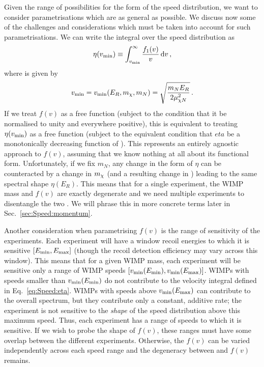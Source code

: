 Given the range of possibilities for the form of the speed distribution, we want to consider parametrisations which are as general as possible. We discuss now some of the challenges and considerations which must be taken into account for such parametrisations. We can write the integral over the speed distribution as
\begin{equation}
\label{eq:Speed:eta}
\eta(\vmin) \equiv \int_{\vmin}^\infty \frac{f_1(v)}{v}\,\mathrm{d}v\,,
\end{equation}
where \vmin is given by
\begin{equation}
v_\textrm{min} = v_\textrm{min}(E_R, \mchi, m_N) = \sqrt{\frac{m_N E_R}{2 \mu_{\chi N}^2}}\,.
\end{equation}
If we treat $f(v)$ as a free function (subject to the condition that it be normalised to unity and everywhere positive), this is equivalent to treating $\eta(\vmin)$ as a free function (subject to the equivalent condition that $eta$ be a monotonically decreasing function of \vmin). This represents an entirely agnostic approach to $f(v)$, assuming that we know nothing at all about its functional form. Unfortunately, if we fix $m_N$, any change in the form of $\eta$ can be counteracted by a change in $\mchi$ (and a resulting change in \vmin) leading to the same spectral shape $\eta(E_R)$. This means that for a single experiment, the WIMP mass and $f(v)$ are exactly degenerate and we need multiple experiments to disentangle the two \cite{Drees:2008}. We will phrase this in more concrete terms later in Sec.~\ref{sec:Speed:momentum}.

Another consideration when parametrising $f(v)$ is the range of sensitivity of the experiments. Each experiment will have a window recoil energies to which it is sensitive $\left[\Emin, \Emax\right]$ (though the recoil detection efficiency may vary across this window). This means that for a given WIMP mass, each experiment will be sensitive only a range of WIMP speeds $\left[\vmin(\Emin), \vmin(\Emax)\right]$. WIMPs with speeds smaller than $\vmin(\Emin)$ do not contribute to the velocity integral defined in Eq.~\ref{eq:Speed:eta}. WIMPs with speeds above $\vmin(\Emax)$ can contribute to the overall spectrum, but they contribute only a constant, additive rate; the experiment is not sensitive to the \textit{shape} of the speed distribution above this maximum speed. Thus, each experiment has a range of speeds to which it is sensitive. If we wish to probe the shape of $f(v)$, these ranges must have some overlap between the different experiments. Otherwise, the $f(v)$ can be varied independently across each speed range and the degeneracy between \mchi and $f(v)$ remains. 


